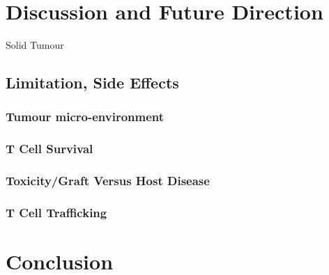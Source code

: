 \documentclass[12pt,oneside]{report}
\begin{document}
\newpage
\section{Discussion and Future Direction}
Solid Tumour

\subsection{Limitation, Side Effects}

\subsubsection{Tumour micro-environment}
\subsubsection{T Cell Survival}
\subsubsection{Toxicity/Graft Versus Host Disease}
\subsubsection{T Cell Trafficking}

\newpage
\section{Conclusion}




\listoffigures

\listoftables
\end{document}
